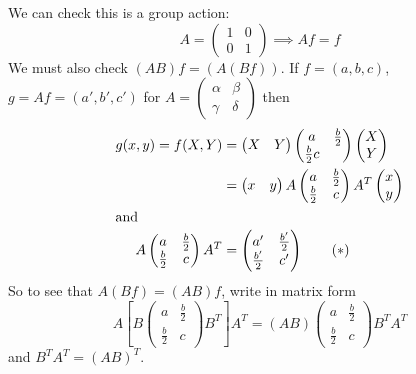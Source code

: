 \documentclass{article}
\begin{document}
\begin{remark}
    We can check this is a group action:
    \begin{equation*}
        A = \begin{pmatrix} 1 & 0 \\ 0 & 1 \end{pmatrix} \implies A f = f
    \end{equation*}
    We must also check $(AB) f = (A (B f))$.
    If $f = (a,b,c)$, $g = Af = (a',b',c')$ for $A = \begin{pmatrix} \alpha & \beta \\ \gamma & \delta \end{pmatrix}$ then
    \begin{align*}
    g(x,y) = f(X,Y) &= \begin{pmatrix}X & Y\end{pmatrix}\begin{pmatrix}a & \frac{b}{2} \\ \frac{b}{2} c \end{pmatrix}\begin{pmatrix}X \\ Y\end{pmatrix} \\
                    &= \begin{pmatrix}x & y\end{pmatrix}A\begin{pmatrix}a & \frac{b}{2} \\ \frac{b}{2} & c \end{pmatrix}A^T \begin{pmatrix}x \\ y\end{pmatrix} \\
        \shortintertext{and}
                    A\begin{pmatrix}a & \frac{b}{2} \\ \frac{b}{2} & c \end{pmatrix}A^T&= \begin{pmatrix} a' & \frac{b'}{2} \\ \frac{b'}{2} & c' \end{pmatrix} \label{eq:9star}\tag{$*$}
    \end{align*}
    So to see that $A(Bf) = (AB)f$, write in matrix form
    \begin{equation*}
    A\left[B \begin{pmatrix}a & \frac{b}{2}\\\frac{b}{2} & c\end{pmatrix} B^T\right]A^T = (AB) \begin{pmatrix}a & \frac{b}{2}\\\frac{b}{2} & c\end{pmatrix} B^T A^T
    \end{equation*}
    and $B^TA^T = (AB)^T$.

\end{remark}
\end{document}
